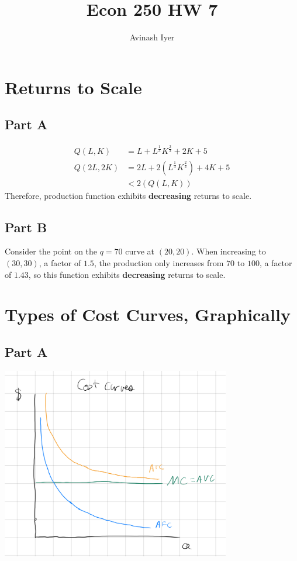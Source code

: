 \documentclass[8pt]{extarticle}
\title{Econ 250 HW 7}
\author{Avinash Iyer}
\date{}
\begin{document}
{
\section{Returns to Scale}
\subsection*{Part A}
\begin{align*}
	Q(L,K) &= L + L^{\frac{1}{3}}K^{\frac{2}{3}} + 2K + 5 \\
	Q(2L,2K) &= 2L + 2\left(L^{\frac{1}{3}}K^{\frac{2}{3}}\right) + 4K + 5 \\
	&<2(Q(L,K))
\end{align*}
Therefore, production function exhibits \textbf{decreasing} returns to scale.
\subsection*{Part B}
Consider the point on the $q=70$ curve at $(20,20)$. When increasing to $(30,30)$, a factor of $1.5$, the production only increases from $70$ to $100$, a factor of $1.43$, so this function exhibits \textbf{decreasing} returns to scale.
\section{Types of Cost Curves, Graphically}
\label{sec:Types of Cost Curves, Graphically}
\subsection*{Part A}
\begin{center}
	\includegraphics[width=10cm]{HW7Q2A}
\end{center}
}
\end{document}

